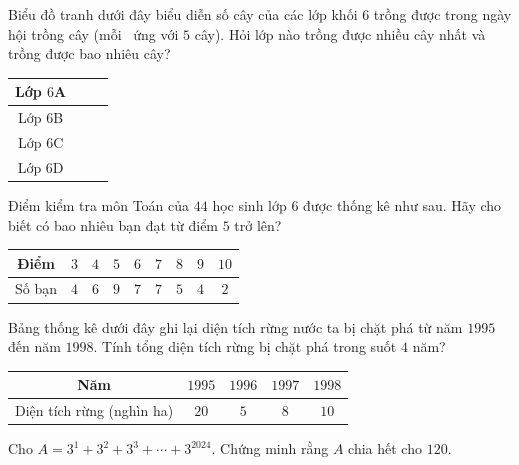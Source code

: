 \begin{bt}
	\text{ }
	\begin{listEX} 
		 \item Biểu đồ tranh dưới đây biểu diễn số cây của các lớp khối $6$ trồng được trong ngày hội trồng cây (mỗi \faTree\ ứng với $5$ cây). Hỏi lớp nào trồng được nhiều cây nhất và trồng được bao nhiêu cây? \begin{center}
		 	
			\begin{tabular}{|c|c|}\hline
				Lớp $6$A & \faTree\ \faTree\ \faTree\\\hline
				Lớp $6$B & \faTree\ \faTree\ \faTree\ \faTree\\\hline
				Lớp $6$C & \faTree\ \faTree\\\hline
				Lớp $6$D & \faTree\ \faTree\ \faTree\\\hline
			\end{tabular} 
		\end{center}
		\item  Điểm kiểm tra môn Toán của $44$ học sinh lớp $6$ được thống kê như sau. Hãy cho biết có bao nhiêu bạn đạt từ điểm $5$ trở lên?
		\begin{center}
			\begin{tabular}{|c|c|c|c|c|c|c|c|c|}\hline
				Điểm & $3$ & $4$ & $5$ & $6$ & $7$ & $8$ & $9$ & $10$\\\hline
				Số bạn & $4$ & $6$ & $9$ & $7$ & $7$ & $5$ & $4$ & $2$\\\hline
			\end{tabular}
		\end{center}
		\item  Bảng thống kê dưới đây ghi lại diện tích rừng nước ta bị chặt phá từ năm $1995$ đến năm $1998$. Tính tổng diện tích rừng bị chặt phá trong suốt $4$ năm?
		\begin{center}
			\begin{tabular}{|c|c|c|c|c|}\hline
				Năm & $1995$ & $1996$ & $1997$ & $1998$\\\hline
				Diện tích rừng (nghìn ha) & $20$ & $5$ & $8$ & $10$\\\hline
			\end{tabular}
		\end{center}
	\end{listEX}
\end{bt}

\begin{bt}
	 Cho $A=3^1+3^2+3^3+\cdots+3^{2024}$. Chứng minh rằng $A$ chia hết cho $120$.
\end{bt}
